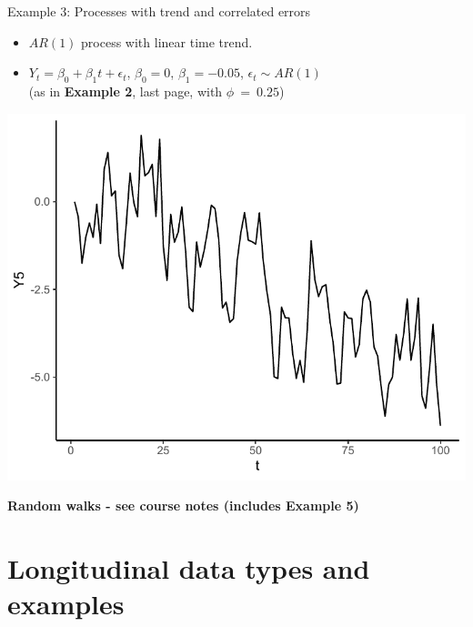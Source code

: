 \documentclass[
  9pt,
  ignorenonframetext,
]{beamer}
\begin{document}
\begin{frame}{}
\protect\hypertarget{section-2}{}
\begin{block}{Example 3: Processes with trend and correlated errors}
\protect\hypertarget{example-3-processes-with-trend-and-correlated-errors}{}
\begin{itemize}
\item
  \(AR(1)\) process with linear time trend.
\item
  \(Y_t = \beta_0 + \beta_1t + \epsilon_t\), \(\beta_0 = 0\),
  \(\beta_1 = -0.05\), \(\epsilon_t \sim AR(1)\)\\
  (as in \textbf{Example 2}, last page, with \(\phi\ =\ 0.25\))
\end{itemize}

\begin{center}\includegraphics[width=0.5\linewidth]{figs_L1/linear time trend-1} \end{center}

\textbf{Random walks - see course notes (includes Example 5)}
\end{block}
\end{frame}

\hypertarget{longitudinal-data-types-and-examples}{%
\section{Longitudinal data types and
examples}\label{longitudinal-data-types-and-examples}}
\end{document}
